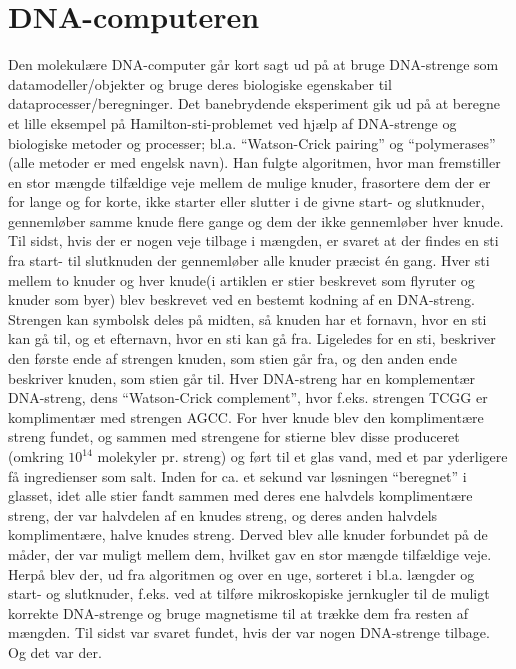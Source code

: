 \documentclass[10pt,a4paper]{article}
\begin{document}
\section{DNA-computeren}
Den molekulære DNA-computer går kort sagt ud på at bruge DNA-strenge som
datamodeller/objekter og bruge deres biologiske egenskaber til
dataprocesser/beregninger.  Det banebrydende eksperiment gik ud på at beregne et
lille eksempel på Hamilton-sti-problemet ved hjælp af DNA-strenge og biologiske
metoder og processer; bl.a. ``Watson-Crick pairing'' og ``polymerases'' (alle
metoder er med engelsk navn). Han fulgte algoritmen, hvor man fremstiller en
stor mængde tilfældige veje mellem de mulige knuder, frasortere dem der er for
lange og for korte, ikke starter eller slutter i de givne start- og slutknuder,
gennemløber samme knude flere gange og dem der ikke gennemløber hver knude. Til
sidst, hvis der er nogen veje tilbage i mængden, er svaret at der findes en sti
fra start- til slutknuden der gennemløber alle knuder præcist én gang.  Hver sti
mellem to knuder og hver knude(i artiklen er stier beskrevet som flyruter og
knuder som byer) blev beskrevet ved en bestemt kodning af en DNA-streng.
Strengen kan symbolsk deles på midten, så knuden har et fornavn, hvor en sti kan
gå til, og et efternavn, hvor en sti kan gå fra.  Ligeledes for en sti,
beskriver den første ende af strengen knuden, som stien går fra, og den anden
ende beskriver knuden, som stien går til. Hver DNA-streng har en komplementær
DNA-streng, dens ``Watson-Crick complement'', hvor f.eks.  strengen TCGG er
komplimentær med strengen AGCC. For hver knude blev den komplimentære streng
fundet, og sammen med strengene for stierne blev disse produceret (omkring
$10^{14}$ molekyler pr. streng) og ført til et glas vand, med et par yderligere
få ingredienser som salt. Inden for ca. et sekund var løsningen ``beregnet'' i
glasset, idet alle stier fandt sammen med deres ene halvdels komplimentære
streng, der var halvdelen af en knudes streng, og deres anden halvdels
komplimentære, halve knudes streng. Derved blev alle knuder forbundet på de
måder, der var muligt mellem dem, hvilket gav en stor mængde tilfældige veje.
Herpå blev der, ud fra algoritmen og over en uge, sorteret i bl.a. længder og
start- og slutknuder, f.eks. ved at tilføre mikroskopiske jernkugler til de
muligt korrekte DNA-strenge og bruge magnetisme til at trække dem fra resten af
mængden. Til sidst var svaret fundet, hvis der var nogen DNA-strenge tilbage. Og
det var der.
\end{document}
